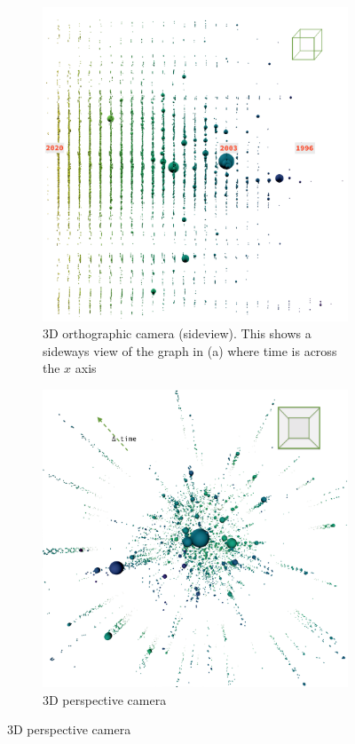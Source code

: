 \begin{figure}[H]
\begin{subfigure}{0.47\textwidth}
         \includegraphics[width=\textwidth]{figures_c3/sideall.png}
         \caption{3D orthographic camera (sideview). This shows a sideways view of the graph in (a) where time is across the $x$ axis }
         \label{fig:sideweb}
     \end{subfigure}
     \hfill

     \begin{subfigure}[b]{0.75\textwidth}
         \centering
         \includegraphics[width=\textwidth]{figures_c3/threeall.png}
         \caption{3D perspective camera}
         \label{fig:3dgeph}
     \end{subfigure}



\end{figure}
